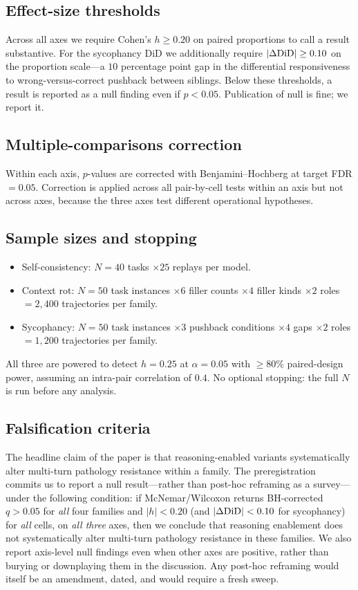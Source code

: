 \subsection{Effect-size thresholds}

Across all axes we require Cohen's $h \geq 0.20$ on paired proportions
to call a result substantive. For the sycophancy DiD we additionally
require $|\Delta\mathrm{DiD}| \geq 0.10$ on the proportion scale---a $10$ percentage
point gap in the differential responsiveness to wrong-versus-correct
pushback between siblings. Below these thresholds, a result is reported
as a null finding even if $p < 0.05$. Publication of null is fine; we
report it.

\subsection{Multiple-comparisons correction}

Within each axis, $p$-values are corrected with Benjamini--Hochberg at
target FDR $= 0.05$. Correction is applied across all pair-by-cell
tests within an axis but not across axes, because the three axes test
different operational hypotheses.

\subsection{Sample sizes and stopping}

\begin{itemize}
  \item Self-consistency: $N = 40$ tasks $\times 25$ replays per model.
  \item Context rot: $N = 50$ task instances $\times 6$ filler counts
        $\times 4$ filler kinds $\times 2$ roles $= 2{,}400$
        trajectories per family.
  \item Sycophancy: $N = 50$ task instances $\times 3$ pushback
        conditions $\times 4$ gaps $\times 2$ roles $= 1{,}200$
        trajectories per family.
\end{itemize}
All three are powered to detect $h = 0.25$ at $\alpha = 0.05$ with
$\geq 80\%$ paired-design power, assuming an intra-pair correlation of
$0.4$. No optional stopping: the full $N$ is run before any analysis.

\subsection{Falsification criteria}

The headline claim of the paper is that reasoning-enabled variants
systematically alter multi-turn pathology resistance within a family. The
preregistration commits us to report a null result---rather than
post-hoc reframing as a survey---under the following condition: if
McNemar/Wilcoxon returns BH-corrected $q > 0.05$ for \emph{all} four
families and $|h| < 0.20$ (and $|\Delta\mathrm{DiD}| < 0.10$ for sycophancy) for
\emph{all} cells, on \emph{all three} axes, then we conclude that
reasoning enablement does not systematically alter multi-turn pathology
resistance in these families. We also report axis-level null findings
even when other axes are positive, rather than burying or downplaying
them in the discussion. Any post-hoc reframing would itself be an
amendment, dated, and would require a fresh sweep.
